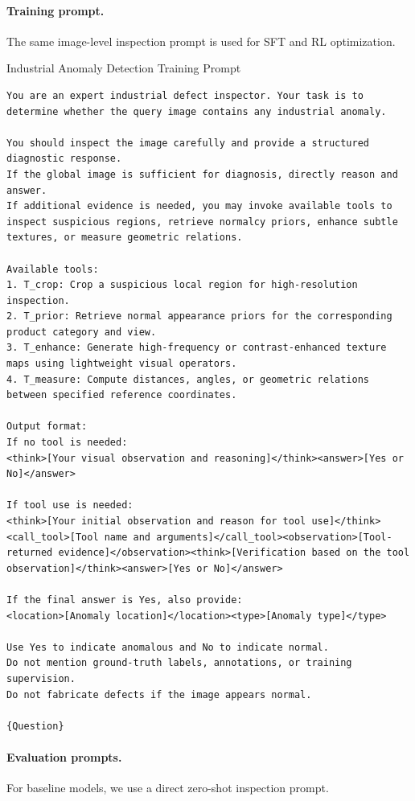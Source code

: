 \documentclass{article}
\begin{document}
{  \paragraph{Training prompt.}
  The same image-level inspection prompt is used for SFT and RL optimization.

 \begin{promptbox}{Industrial Anomaly Detection Training Prompt}
\begin{lstlisting}[style=promptstyle]
You are an expert industrial defect inspector. Your task is to determine whether the query image contains any industrial anomaly.

You should inspect the image carefully and provide a structured diagnostic response. 
If the global image is sufficient for diagnosis, directly reason and answer. 
If additional evidence is needed, you may invoke available tools to inspect suspicious regions, retrieve normalcy priors, enhance subtle textures, or measure geometric relations.

Available tools:
1. T_crop: Crop a suspicious local region for high-resolution inspection.
2. T_prior: Retrieve normal appearance priors for the corresponding product category and view.
3. T_enhance: Generate high-frequency or contrast-enhanced texture maps using lightweight visual operators.
4. T_measure: Compute distances, angles, or geometric relations between specified reference coordinates.

Output format:
If no tool is needed:
<think>[Your visual observation and reasoning]</think><answer>[Yes or No]</answer>

If tool use is needed:
<think>[Your initial observation and reason for tool use]</think><call_tool>[Tool name and arguments]</call_tool><observation>[Tool-returned evidence]</observation><think>[Verification based on the tool observation]</think><answer>[Yes or No]</answer>

If the final answer is Yes, also provide:
<location>[Anomaly location]</location><type>[Anomaly type]</type>

Use Yes to indicate anomalous and No to indicate normal.
Do not mention ground-truth labels, annotations, or training supervision.
Do not fabricate defects if the image appears normal.

{Question}
\end{lstlisting}
\end{promptbox}
  \paragraph{Evaluation prompts.}
  For baseline models, we use a direct zero-shot inspection prompt. 

}
\end{document}
